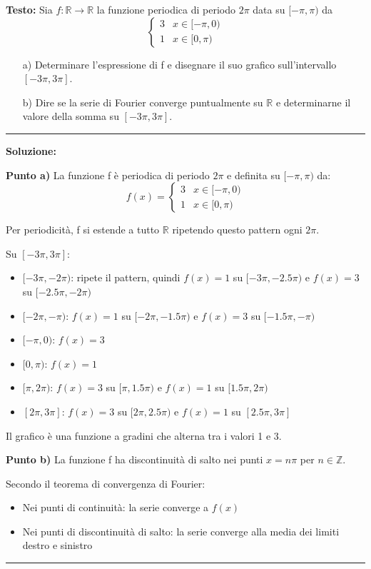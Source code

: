 \documentclass[12pt, a4paper]{article}
\newenvironment{solution}
{\par\noindent\rule{\textwidth}{0.4pt}\par\textbf{Soluzione:}\medskip\par}
{\par\rule{\textwidth}{0.4pt}\par\bigskip}
\begin{document}
\textbf{Testo:} Sia $f: \mathbb{R} \rightarrow \mathbb{R}$ la funzione periodica di periodo $2\pi$ data su $[-\pi, \pi)$ da
\[ \begin{cases} 3 & x \in [-\pi,0) \\ 1 & x \in [0,\pi) \end{cases} \]
\begin{enumerate}
    \item[a)] Determinare l'espressione di f e disegnare il suo grafico sull'intervallo $[-3\pi, 3\pi]$.
    \item[b)] Dire se la serie di Fourier converge puntualmente su $\mathbb{R}$ e determinarne il valore della somma su $[-3\pi, 3\pi]$.
\end{enumerate}

\begin{solution}
\textbf{Punto a)} La funzione f è periodica di periodo $2\pi$ e definita su $[-\pi, \pi)$ da:
\[
f(x) = \begin{cases} 3 & x \in [-\pi,0) \\ 1 & x \in [0,\pi) \end{cases}
\]

Per periodicità, f si estende a tutto $\mathbb{R}$ ripetendo questo pattern ogni $2\pi$.

Su $[-3\pi, 3\pi]$:
\begin{itemize}
    \item $[-3\pi, -2\pi)$: ripete il pattern, quindi $f(x) = 1$ su $[-3\pi, -2.5\pi)$ e $f(x) = 3$ su $[-2.5\pi, -2\pi)$
    \item $[-2\pi, -\pi)$: $f(x) = 1$ su $[-2\pi, -1.5\pi)$ e $f(x) = 3$ su $[-1.5\pi, -\pi)$
    \item $[-\pi, 0)$: $f(x) = 3$
    \item $[0, \pi)$: $f(x) = 1$
    \item $[\pi, 2\pi)$: $f(x) = 3$ su $[\pi, 1.5\pi)$ e $f(x) = 1$ su $[1.5\pi, 2\pi)$
    \item $[2\pi, 3\pi]$: $f(x) = 3$ su $[2\pi, 2.5\pi)$ e $f(x) = 1$ su $[2.5\pi, 3\pi]$
\end{itemize}

Il grafico è una funzione a gradini che alterna tra i valori 1 e 3.

\vspace{0.5cm}

\textbf{Punto b)} La funzione f ha discontinuità di salto nei punti $x = n\pi$ per $n \in \mathbb{Z}$.

Secondo il teorema di convergenza di Fourier:
\begin{itemize}
    \item Nei punti di continuità: la serie converge a $f(x)$
    \item Nei punti di discontinuità di salto: la serie converge alla media dei limiti destro e sinistro
\end{itemize}


\end{solution}
\end{document}
